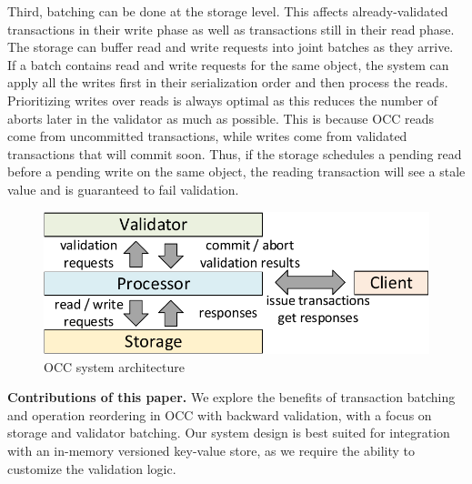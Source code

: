 Third, batching can be done at the storage level. This affects
already-validated transactions in their write phase as well as transactions
still in their read phase. The storage can buffer read and write requests into
joint batches as they arrive. If a batch contains read and write requests for
the same object, the system can apply all the writes first in their serialization
order and then process the reads. Prioritizing writes over reads is always
optimal as this reduces the number of aborts later in the validator as much as possible. This is
because OCC reads come from uncommitted transactions, while writes come from
validated transactions that will commit soon. Thus, if the storage schedules a
pending read before a pending write on the same object, the reading transaction
will see a stale value and is guaranteed to fail validation. 


\begin{figure}[t]
 \centering
 \includegraphics[width=0.9\columnwidth]{figures/arch.pdf}
 \vspace{-.5em}
 \caption{OCC system architecture}
 \vspace{-1em}
 \label{fig:occ_arch}
\end{figure}


{\bf Contributions of this paper.}
We explore the benefits of transaction batching and operation reordering in OCC with backward validation, with a focus on storage and validator batching. Our system design is best suited for integration with an in-memory versioned key-value store, as we require the ability to customize the validation logic. 

